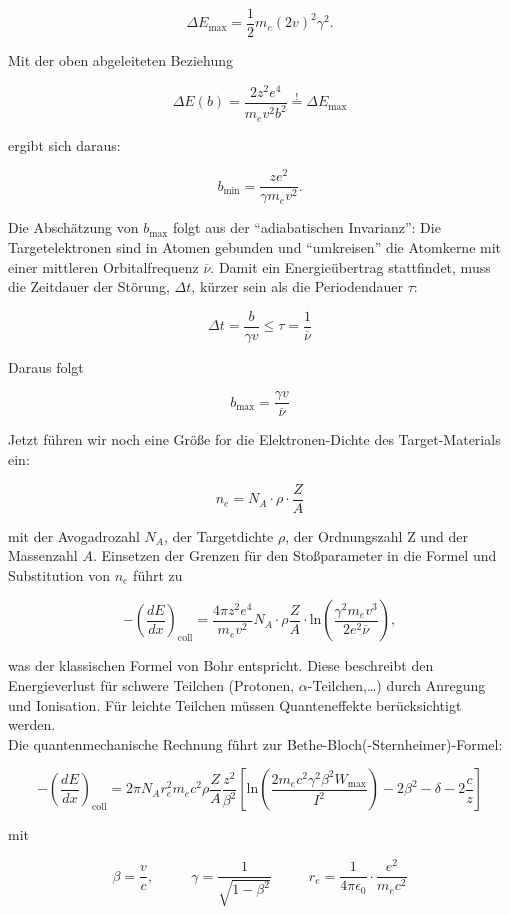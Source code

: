 \[\Delta E_{\text{max}}=\frac{1}{2}m_e(2v)^2\gamma^2.\]

Mit der oben abgeleiteten Beziehung

\[\Delta E(b)=\frac{2z^2e^4}{m_ev^2b^2}\overset{!}{=}\Delta E_{\text{max}}\]

ergibt sich daraus:

\[b_{\text{min}}=\frac{ze^2}{\gamma m_e v^2}.\]

Die Abschätzung von $b_{\text{max}}$ folgt aus der "`adiabatischen Invarianz"': Die Targetelektronen
sind in Atomen gebunden und "`umkreisen"' die Atomkerne mit einer mittleren Orbitalfrequenz
$\overline{\nu}$. Damit ein Energieübertrag stattfindet, muss die Zeitdauer der Störung, $\Delta t$,
kürzer sein als die Periodendauer $\tau$:

\[\Delta t=\frac{b}{\gamma v} \le \tau =\frac{1}{\overline{\nu}}\]

Daraus folgt

\[b_{\text{max}}=\frac{\gamma v}{\overline{\nu}}\]

Jetzt führen wir noch eine Größe for die Elektronen-Dichte des Target-Materials ein:

\[n_e=N_A\cdot \rho\cdot \frac{Z}{A}\]

mit der Avogadrozahl $N_A$, der Targetdichte $\rho$, der Ordnungszahl Z und der Massenzahl $A$.
Einsetzen der Grenzen für den Stoßparameter in die Formel und Substitution von $n_e$ führt zu

\[-\left(\frac{dE}{dx}\right)_{\text{coll}} = \frac{4\pi z^2e^4}{m_ev^2}N_A\cdot \rho
\frac{Z}{A}\cdot\text{ln}\left(\frac{\gamma^2 m_e v^3}{2e^2\overline{\nu}}\right), \]

was der klassischen Formel von Bohr entspricht. Diese beschreibt den Energieverlust für schwere
Teilchen (Protonen, $\alpha$-Teilchen,\ldots) durch Anregung und Ionisation. Für leichte Teilchen
müssen Quanteneffekte berücksichtigt werden.
\\
Die quantenmechanische Rechnung führt zur Bethe-Bloch(-Sternheimer)-Formel:

\[-\left(\frac{dE}{dx}\right)_{\text{coll}} = 2\pi N_A r_e^2 m_e c^2 \rho \frac{Z}{A}
\frac{z^2}{\beta^2}\left[ \text{ln} \left( \frac{2m_e c^2 \gamma^2 \beta^2 W_{\text{max}}}{I^2}
\right) -2\beta^2 -\delta -2\frac{c}{z} \right]\]

mit 

\[\beta =
\frac{v}{c},~~~~~~~~~~~~\gamma=\frac{1}{\sqrt{1-\beta^2}}~~~~~~~~~~~~
r_e=\frac{1}{4\pi\epsilon_0}\cdot\frac{e^2}{m_e c^2}\]

